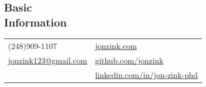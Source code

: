 \documentclass[margin,line, 12pt]{res}
\begin{document}
\begin{spacing}{1.0}	


\begin{resume}
\vspace*{-2mm}
\section{Basic\\Information}
\begin{tabular}{@{}p{4.75in}p{4in}}
  (248)909-1107 &  \href{https://www.jonzink.com}{jonzink.com}  \\
  \href{mailto:jonzink123@gmail.com}{jonzink123@gmail.com} & \href{https://github.com/jonzink}{github.com/jonzink} \\
  
  & \href{https://www.linkedin.com/in/jon-zink-phd/}{linkedin.com/in/jon-zink-phd} \\
\end{tabular}



\end{resume}
\end{spacing}
\end{document}
